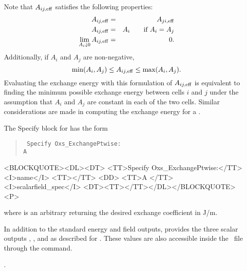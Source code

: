 \begin{description}
   Note that $A_{ij,{\rm eff}}$ satisfies
   the following properties:
   \begin{eqnarray*}
        A_{ij,{\rm eff}} & = & A_{ji,{\rm eff}} \\
        A_{ij,{\rm eff}} & = & A_i \qquad \mbox{if $A_i=A_j$} \\
        \lim_{A_i\downarrow 0} A_{ij,{\rm eff}} & = & 0.
   \end{eqnarray*}
   Additionally, if $A_i$ and $A_j$ are non-negative,
   \begin{displaymath}
        \min(A_i,A_j) \leq  A_{ij,{\rm eff}}  \leq \max(A_i,A_j).
   \end{displaymath}
   Evaluating the exchange energy with this formulation of $A_{ij,{\rm
   eff}}$ is equivalent to finding the minimum possible exchange energy
   between cells $i$ and $j$ under the assumption that $A_i$ and $A_j$
   are constant in each of the two cells.  Similar considerations are
   made in computing the exchange energy for a  \cite{porter2001}.

   The Specify block for  has the form
   \begin{latexonly}
      \begin{quote}\tt
      Specify Oxs\_ExchangePtwise: \ocb\\
        \bi A \\
      \ccb
      \end{quote}
   \end{latexonly}
   \begin{rawhtml}
   <BLOCKQUOTE><DL><DT>
   <TT>Specify Oxs_ExchangePtwise:</TT><I>name</I> <TT>{</TT>
       <DD> <TT>A </TT><I>scalarfield_spec</I>
   <DT><TT>}</TT></DL></BLOCKQUOTE><P>
   \end{rawhtml}
   where  is an arbitrary
    returning the desired exchange
   coefficient in J/m.

   In addition to the standard energy and field outputs,
    provides the three scalar outputs
   , , and
    as described for .
   These values are also accessible inside the \MIF\ file through the
    command.

   \begin{ExampleMifs}[Example]
     .
   \end{ExampleMifs}


\end{description}
